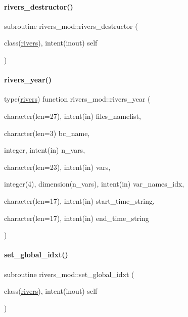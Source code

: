 \paragraph{\texorpdfstring{rivers\+\_\+destructor()}{rivers\_destructor()}}
{\footnotesize\ttfamily subroutine rivers\+\_\+mod\+::rivers\+\_\+destructor (\begin{DoxyParamCaption}\item[{class(\mbox{\hyperlink{structrivers__mod_1_1rivers}{rivers}}), intent(inout)}]{self }\end{DoxyParamCaption})}

\mbox{\label{namespacerivers__mod_a16f08543441d9aaf0ebf805e9f68c265}} 
\paragraph{\texorpdfstring{rivers\+\_\+year()}{rivers\_year()}}
{\footnotesize\ttfamily type(\mbox{\hyperlink{structrivers__mod_1_1rivers}{rivers}}) function rivers\+\_\+mod\+::rivers\+\_\+year (\begin{DoxyParamCaption}\item[{character(len=27), intent(in)}]{files\+\_\+namelist,  }\item[{character(len=3)}]{bc\+\_\+name,  }\item[{integer, intent(in)}]{n\+\_\+vars,  }\item[{character(len=23), intent(in)}]{vars,  }\item[{integer(4), dimension(n\+\_\+vars), intent(in)}]{var\+\_\+names\+\_\+idx,  }\item[{character(len=17), intent(in)}]{start\+\_\+time\+\_\+string,  }\item[{character(len=17), intent(in)}]{end\+\_\+time\+\_\+string }\end{DoxyParamCaption})\hspace{0.3cm}{\ttfamily [private]}}

\mbox{\label{namespacerivers__mod_a343eb9cf977ea49b57ba6749c2af6d24}} 
\paragraph{\texorpdfstring{set\+\_\+global\+\_\+idxt()}{set\_global\_idxt()}}
{\footnotesize\ttfamily subroutine rivers\+\_\+mod\+::set\+\_\+global\+\_\+idxt (\begin{DoxyParamCaption}\item[{class(\mbox{\hyperlink{structrivers__mod_1_1rivers}{rivers}}), intent(inout)}]{self }\end{DoxyParamCaption})\hspace{0.3cm}{\ttfamily [private]}}

